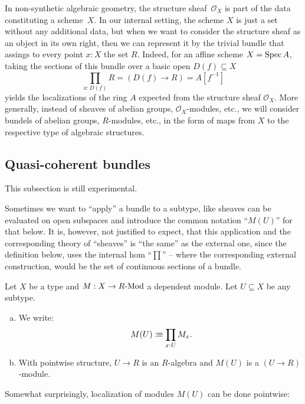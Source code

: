 In non-synthetic algebraic geometry,
the structure sheaf~$\mathcal{O}_X$ is part of the data constituting a scheme~$X$.
In our internal setting,
the scheme $X$ is just a set without any additional data,
but when we want to consider the structure sheaf as an object in its own right,
then we can represent it by the trivial bundle
that assings to every point $x : X$ the set $R$.
Indeed, for an affine scheme $X = \operatorname{Spec} A$,
taking the sections of this bundle over a basic open $D(f) \subseteq X$
\[ \prod_{x : D(f)} R = (D(f) \to R) = A[f^{-1}] \]
yields the localizations of the ring $A$
expected from the structure sheaf $\mathcal{O}_X$.
More generally,
instead of sheaves of abelian groups, $\mathcal{O}_X$-modules, etc.,
we will consider bundels of abelian groups, $R$-modules, etc.,
in the form of maps from $X$ to the respective type of algebraic structures.

\subsection{Quasi-coherent bundles}

This subsection is still experimental.

Sometimes we want to ``apply'' a bundle to a subtype,
like sheaves can be evaluated on open subspaces
and introduce the common notation ``$M(U)$'' for that below.
It is, however, not justified to expect, that this application
and the corresponding theory of ``sheaves'' is ``the same'' as the external one,
since the definition below, uses the internal hom ``$\prod$''
-- where the corresponding external construction, would be the set of continuous sections of a bundle.

\begin{definition}
  Let $X$ be a type and $M:X\to R\text{-}\mathrm{Mod}$ a dependent module.
  Let $U\subseteq X$ be any subtype.
  \begin{enumerate}[(a)]
  \item We write:
    \[
      M(U)\colonequiv \prod_{x:U}M_x
      \rlap{.}
    \]
  \item With pointwise structure, $U\to R$ is an $R$-algebra
    and $M(U)$ is a $(U\to R)$-module.
  \end{enumerate}
\end{definition}

Somewhat surprisingly, localization of modules $M(U)$
can be done pointwise:

